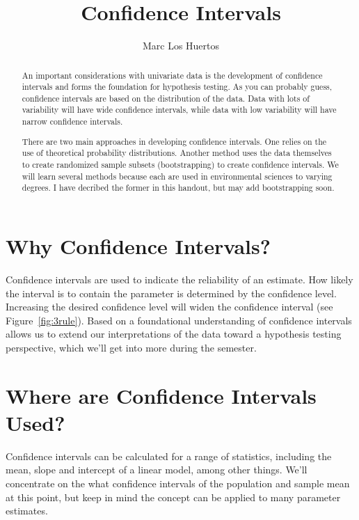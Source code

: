 \documentclass{tufte-handout}\usepackage[]{graphicx}\usepackage[]{color}
\title{Confidence Intervals %
}
\author[Marc Los Huertos]{Marc Los Huertos}
\begin{document}
\maketitle%

\begin{abstract}
\noindent An important considerations with univariate data is the development of confidence intervals and forms the foundation for hypothesis testing. As you can probably guess, confidence intervals are based on the distribution of the data. Data with lots of variability will have wide confidence intervals, while data with low variability will have narrow confidence intervals. 

There are two main approaches in developing confidence intervals. One relies on the use of theoretical probability distributions. Another method uses the data themselves to create randomized sample subsets (bootstrapping) to create confidence intervals. We will learn several methods because each are used in environmental sciences to varying degrees. I have decribed the former in this handout, but may add bootstrapping soon. 
\end{abstract}




\section{Why Confidence Intervals?}

Confidence intervals are used to indicate the reliability of an estimate. How likely the interval is to contain the parameter is determined by the confidence level. Increasing the desired confidence level will widen the confidence interval (see Figure~\ref{fig:3rule}). Based on a foundational understanding of confidence intervals allows us to extend our interpretations of the data toward a hypothesis testing perspective, which we'll get into more during the semester.

\section{Where are Confidence Intervals Used?}

Confidence intervals can be calculated for a range of statistics, including the mean, slope and intercept of a linear model, among other things. We'll concentrate on the what confidence intervals of the population and sample mean at this point, but keep in mind the concept can be applied to many parameter estimates.
\end{document}
